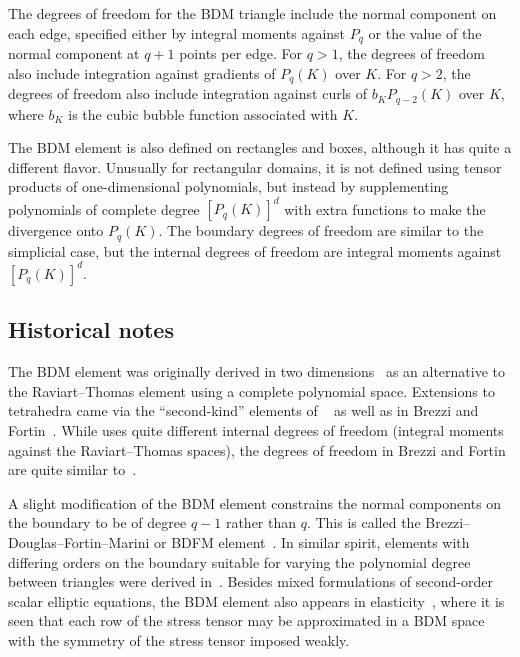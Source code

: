 The degrees of freedom for the BDM triangle include the normal component on each
edge, specified either by integral moments against $P_q$ or the value
of the normal component at
\( q + 1 \) points per edge.
For \( q > 1 \), the degrees of freedom also include integration
against gradients of $P_q(K)$ over $K$.  For \( q > 2 \), the degrees
of freedom also include integration against curls of $b_K P_{q-2}(K)$
over $K$, where \( b_K \) is the cubic bubble function associated with
\( K \).


The BDM element is also defined on rectangles and boxes, although it
has quite a different flavor. Unusually for rectangular domains, it is
not defined using tensor products of one-dimensional polynomials, but
instead by supplementing polynomials of complete degree \( [P_q(K)]^d
\) with extra functions to make the divergence onto \( P_q(K) \).  The
boundary degrees of freedom are similar to the simplicial case, but
the internal degrees of freedom are integral moments against \(
[P_q(K)]^d \).

\subsection{Historical notes}

The BDM element was originally derived in two
dimensions~\cite{Brezzi1974aDouglasEtAl1985} as an alternative to the
Raviart--Thomas element using a complete polynomial space. Extensions
to tetrahedra came via the ``second-kind'' elements of
\nedelec{}~\cite{Nedelec1986} as well as in Brezzi and
Fortin~\cite{Brezzi1974aFortin1991}. While \nedelec{} uses quite different
internal degrees of freedom (integral moments against the
Raviart--Thomas spaces), the degrees of freedom in Brezzi and Fortin
are quite similar to~\cite{Brezzi1974aDouglasEtAl1985}.

A slight modification of the BDM element constrains the normal
components on the boundary to be of degree \( q - 1 \) rather than \(
q \). This is called the Brezzi--Douglas--Fortin--Marini or BDFM
element~\cite{Brezzi1974aFortin1991}. In similar spirit, elements with
differing orders on the boundary suitable for varying the polynomial
degree between triangles were derived
in~\cite{Brezzi1974aDouglasEtAl1985a}.  Besides mixed formulations of
second-order scalar elliptic equations, the BDM element also appears
in elasticity~\cite{ArnoldFalkWinther2007a}, where it is seen that each
row of the stress tensor may be approximated in a BDM space with the
symmetry of the stress tensor imposed weakly.

